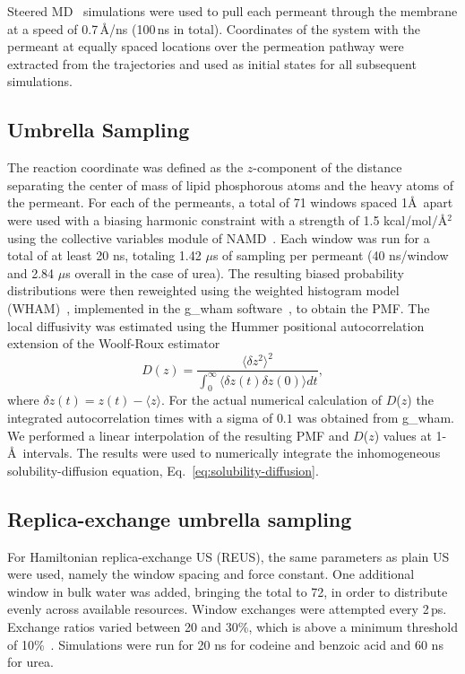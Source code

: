 Steered MD~\cite{Izrailev1997,Sotomayor2007} simulations were used to pull each permeant through the membrane at a speed of 0.7\,\AA/ns (100\,ns in total).  Coordinates of the system with the permeant at equally spaced locations over the permeation pathway were extracted from the trajectories and used as initial states for all subsequent simulations.

\subsection{Umbrella Sampling}

\par The reaction coordinate was defined as the $z$-component of the distance separating the center of mass of lipid phosphorous atoms and the heavy atoms of the permeant. For each of the permeants, a total of 71 windows spaced 1\AA~apart were used with a biasing harmonic constraint with a strength of 1.5 kcal/mol/\AA$^2$ using the collective variables module of NAMD~\cite{Henin2010}.  Each window was run for a total of at least 20 ns, totaling 1.42 $\mu$s of sampling per permeant (40 ns/window and 2.84 $\mu$s overall in the case of urea). The resulting biased probability distributions were then reweighted using the weighted histogram model (WHAM)~\cite{Kumar1992,Tan2012,Chodera2007}, implemented in the g\_wham software~\cite{Hub2010}, to obtain the PMF. The local diffusivity was estimated using the Hummer positional autocorrelation extension of the Woolf-Roux estimator~\cite{Hummer2005,Woolf1994}
\begin{equation}
D(z) = \frac{\langle\delta z^2\rangle^2}{\int_{0}^{\infty}\langle\delta z(t)\delta z(0)\rangle dt},
\label{eq:hummer}
\end{equation}
where $\delta z(t) = z(t)-\langle z\rangle$. For the actual numerical calculation of $D$($z$) the integrated autocorrelation times with a sigma of $0.1$ was obtained from g\_wham. We performed a linear interpolation of the resulting PMF and $D$($z$) values at 1-\AA~intervals. The results were used to numerically integrate the inhomogeneous solubility-diffusion equation, Eq.~\ref{eq:solubility-diffusion}.

\subsection{Replica-exchange umbrella sampling}
\par For Hamiltonian replica-exchange US (REUS), the same parameters as plain US were used, namely the window spacing and force constant. One additional window in bulk water was added, bringing the total to 72, in order to distribute evenly across available resources.  Window exchanges were attempted every 2\,ps. Exchange ratios varied between 20 and 30\%, which is above a minimum threshold of 10\%~\cite{Sugita1999}.  Simulations were run for 20 ns for codeine and benzoic acid and 60 ns for urea.

